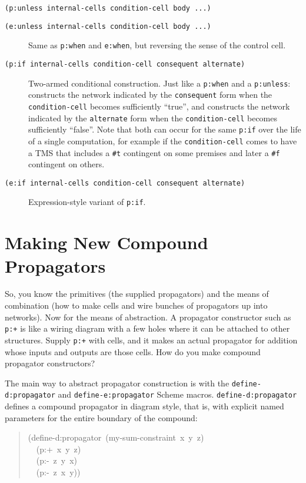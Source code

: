 \documentclass[12pt,letterpaper,english]{article}
\begin{document}
\texttt{(p:unless internal-cells condition-cell body ...)}
\begin{description}
\item[{\texttt{(e:unless internal-cells condition-cell body ...)}}] \leavevmode 
Same as \texttt{p:when} and \texttt{e:when}, but reversing the sense of the
control cell.

\item[{\texttt{(p:if internal-cells condition-cell consequent alternate)}}] \leavevmode 
Two-armed conditional construction.  Just like a \texttt{p:when} and a
\texttt{p:unless}: constructs the network indicated by the \texttt{consequent}
form when the \texttt{condition-cell} becomes sufficiently ``true'', and
constructs the network indicated by the \texttt{alternate} form when the
\texttt{condition-cell} becomes sufficiently ``false''.  Note that both can
occur for the same \texttt{p:if} over the life of a single computation,
for example if the \texttt{condition-cell} comes to have a TMS that includes
a \texttt{{\#}t} contingent on some premises and later a \texttt{{\#}f} contingent
on others.

\item[{\texttt{(e:if internal-cells condition-cell consequent alternate)}}] \leavevmode 
Expression-style variant of \texttt{p:if}.

\end{description}



\hypertarget{making-new-compound-propagators}{}
\section{Making New Compound Propagators}
\label{making-new-compound-propagators}

So, you know the primitives (the supplied propagators) and the means
of combination (how to make cells and wire bunches of propagators up
into networks).  Now for the means of abstraction.  A propagator
constructor such as \texttt{p:+} is like a wiring diagram with a few holes
where it can be attached to other structures.  Supply \texttt{p:+} with
cells, and it makes an actual propagator for addition whose inputs and
outputs are those cells.  How do you make compound propagator
constructors?

The main way to abstract propagator construction is with the
\texttt{define-d:propagator} and \texttt{define-e:propagator} Scheme macros.
\texttt{define-d:propagator} defines a compound propagator in diagram style,
that is, with explicit named parameters for the entire boundary of the
compound:
\begin{quote}{\ttfamily \raggedright \noindent
(define-d:propagator~(my-sum-constraint~x~y~z)~\\
~~(p:+~x~y~z)~\\
~~(p:-~z~y~x)~\\
~~(p:-~z~x~y))
}\end{quote}
\end{document}
